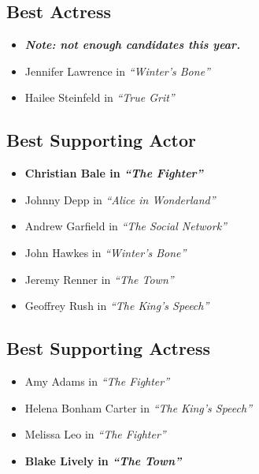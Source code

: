\documentclass{article}
\begin{document}
\begin{multicols}{2}
\subsection*{Best Actress}
  \begin{itemize}
    \setlength{\parskip}{0pt}
    \setlength{\itemsep}{0pt}
    \scriptsize
    \item[] \textbf{\emph{Note: not enough candidates this year.}}
    \footnotesize
    \item[] Jennifer Lawrence in \emph{``Winter's Bone''}
    \item[] Hailee Steinfeld in \emph{``True Grit''}
  \end{itemize}

\subsection*{Best Supporting Actor}
  \begin{itemize}
    \setlength{\parskip}{0pt}
    \setlength{\itemsep}{0pt}
    \item \textbf{Christian Bale in \emph{``The Fighter''}}
    \item[] Johnny Depp in \emph{``Alice in Wonderland''}
    \item[] Andrew Garfield in \emph{``The Social Network''}
    \item[] John Hawkes in \emph{``Winter's Bone''}
    \item[] Jeremy Renner in \emph{``The Town''}
    \item[] Geoffrey Rush in \emph{``The King's Speech''}
  \end{itemize}

\subsection*{Best Supporting Actress}
  \begin{itemize}
    \setlength{\parskip}{0pt}
    \setlength{\itemsep}{0pt}
    \item[] Amy Adams in \emph{``The Fighter''}
    \item[] Helena Bonham Carter in \emph{``The King's Speech''}
    \item[] Melissa Leo in \emph{``The Fighter''}
    \item \textbf{Blake Lively in \emph{``The Town''}}
  \end{itemize}


\end{multicols}
\end{document}
